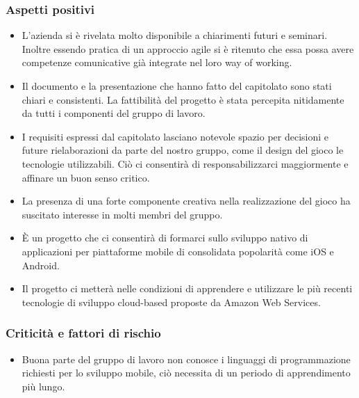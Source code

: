 		\subsubsection{Aspetti positivi}
			\begin{itemize}
				\item L’azienda si è rivelata molto disponibile a chiarimenti futuri e seminari. Inoltre essendo pratica di un approccio agile si è ritenuto che essa possa avere competenze comunicative già integrate nel loro way of working.
				\item Il documento e la presentazione che hanno fatto del capitolato sono stati chiari e consistenti. La fattibilità del progetto è stata percepita nitidamente da tutti i componenti del gruppo di lavoro.
				\item I requisiti espressi dal capitolato lasciano notevole spazio per decisioni e future rielaborazioni da parte del nostro gruppo, come il design del gioco le tecnologie utilizzabili. Ciò ci consentirà di responsabilizzarci maggiormente e affinare un buon senso critico.
				\item La presenza di una forte componente creativa nella realizzazione del gioco ha suscitato interesse in molti membri del gruppo.
				\item È un progetto che ci consentirà di formarci sullo sviluppo nativo di applicazioni per piattaforme mobile di consolidata popolarità come iOS e Android.
				\item Il progetto ci metterà nelle condizioni di apprendere e utilizzare le più recenti tecnologie di sviluppo cloud-based proposte da Amazon Web Services.
			\end{itemize}
			
		\subsubsection{Criticità e fattori di rischio}
			\begin{itemize}
				\item Buona parte del gruppo di lavoro non conosce i linguaggi di programmazione richiesti per lo sviluppo mobile, ciò necessita di un periodo di apprendimento più lungo.
			\end{itemize}
\newpage
				
				
				
				
				
				
				
				
				
				
				
				
				
				
				
				
				
				
				
				
				
				
				
				
				
				
				
				
				
				
				